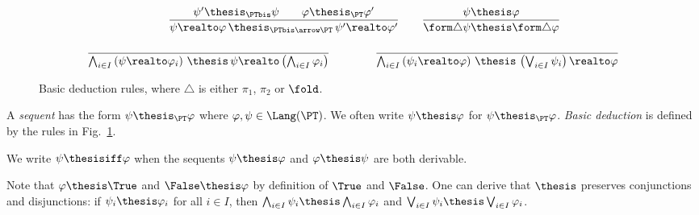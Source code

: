 \begin{figure}[t!]
\[\begin{array}{c}
\qquad

\dfrac{\psi' \thesis_{\PTbis} \psi
  \qquad
  \varphi \thesis_{\PT} \varphi'}
  {\psi \realto \varphi \,\thesis_{\PTbis \arrow \PT}\, \psi' \realto \varphi'}

\qquad

\dfrac{\psi \thesis \varphi}
  {\form\triangle \psi \thesis \form\triangle \varphi}

\\\\

\dfrac{}
  {\bigwedge_{i \in I}\left(\psi \realto \varphi_i \right)
  \,\thesis\,
  \psi \realto \left(\bigwedge_{i \in I} \varphi_i\right)}

\qquad\qquad

\dfrac{}
  {\bigwedge_{i \in I}\left( \psi_i \realto \varphi \right)
  \,\thesis\,
  \left(\bigvee_{i \in I} \psi_i \right) \realto \varphi}

\end{array}
\]
\caption{Basic deduction rules, where $\triangle$ is either $\pi_1$, $\pi_2$ or $\fold$.%
\label{fig:log:ded}}
\end{figure}



\begin{definition}[Deduction]
A \emph{sequent} has the form $\psi \thesis_{\PT} \varphi$
where $\varphi,\psi \in \Lang(\PT)$.
We often write $\psi \thesis \varphi$ for $\psi \thesis_{\PT} \varphi$.
%
\emph{Basic deduction} is defined by the rules in
Fig.~\ref{fig:log:ded}.

We write $\psi \thesisiff \varphi$ when the sequents
$\psi \thesis \varphi$ and $\varphi \thesis \psi$
are both derivable.
\end{definition}

Note that $\varphi \thesis \True$ and $\False \thesis \varphi$
by definition of $\True$ and $\False$.
%
One can derive that $\thesis$ preserves conjunctions
and disjunctions:
if $\psi_i \thesis \varphi_i$ for all $i \in I$,
then
$\bigwedge_{i \in I} \psi_i \thesis \bigwedge_{i \in I} \varphi_i$
and
$\bigvee_{i \in I} \psi_i \thesis \bigvee_{i \in I} \varphi_i$.

